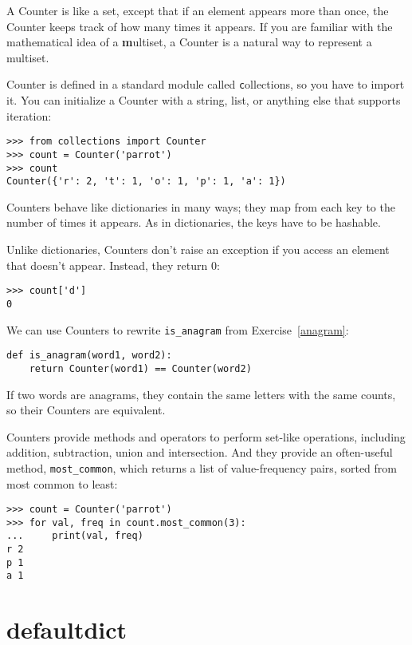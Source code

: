 \documentclass[
DIV=11,
fontsize=13,
twoside,
headinclude=false,
titlepage=firstiscover,
abstract=true,
headsepline=true,
footsepline=true,
chapterprefix=true, %
headings=big,
bibliography=totoc,%
captions=tableheading
]{scrbook}
\theoremstyle{definition}
\begin{document}
A Counter is like a set, except that if an element appears more
than once, the Counter keeps track of how many times it appears.
If you are familiar with the mathematical idea of a {\textbf multiset},
a Counter is a natural way to represent a multiset.

Counter is defined in a standard module called {\texttt collections},
so you have to import it.  You can initialize a Counter with a string,
list, or anything else that supports iteration:

\begin{lstlisting}
>>> from collections import Counter
>>> count = Counter('parrot')
>>> count
Counter({'r': 2, 't': 1, 'o': 1, 'p': 1, 'a': 1})
\end{lstlisting}

Counters behave like dictionaries in many ways; they map from each
key to the number of times it appears.  As in dictionaries,
the keys have to be hashable.

Unlike dictionaries, Counters don't raise an exception if you access
an element that doesn't appear.  Instead, they return 0:

\begin{lstlisting}
>>> count['d']
0
\end{lstlisting}

We can use Counters to rewrite \verb"is_anagram" from
Exercise~\ref{anagram}:

\begin{lstlisting}
def is_anagram(word1, word2):
    return Counter(word1) == Counter(word2)
\end{lstlisting}

If two words are anagrams, they contain the same letters with the same
counts, so their Counters are equivalent.

Counters provide methods and operators to perform set-like operations,
including addition, subtraction, union and intersection.  And
they provide an often-useful method, \verb"most_common", which
returns a list of value-frequency pairs, sorted from most common to
least:

\begin{lstlisting}
>>> count = Counter('parrot')
>>> for val, freq in count.most_common(3):
...     print(val, freq)
r 2
p 1
a 1
\end{lstlisting}


\section{defaultdict}
\end{document}
